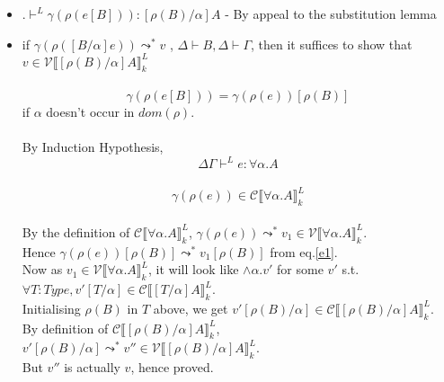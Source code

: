 \documentclass[12pt]{article}
\begin{document}
\begin{itemize} 
\item $. \vdash^L \gamma(\rho(e [B])) :  [\rho(B)/\alpha]A$
  - By appeal to the substitution lemma\\
\item if $ \gamma(\rho([B/\alpha]e)) \leadsto^{*} v$ ,
$\Delta \vdash B, \Delta \vdash \Gamma$, then it suffices to show that\\
$v \in \mathscr{V}\llbracket [\rho(B)/ \alpha] A
\rrbracket_k^L$\\
\\
\begin{equation} \label{e1}
\gamma(\rho(e [B])) = \gamma(\rho(e)) [\rho(B)]
\end{equation}
if $\alpha$ doesn't occur in $dom(\rho)$.\\
\\
By Induction Hypothesis,\\
$$
\Delta\Gamma \vdash^{L} e:\forall \alpha.A
$$\\
$$
\gamma(\rho(e)) \in
\mathscr{C}\llbracket\forall\alpha.A \rrbracket_k^L
$$\\
By the definition of $\mathscr{C}\llbracket\forall\alpha.A
\rrbracket_k^L$, $\gamma(\rho(e)) \leadsto^{*} v_1 \in \mathscr{V}\llbracket \forall\alpha.A
\rrbracket_k^L$.\\
Hence $\gamma(\rho(e)) [\rho(B)] \leadsto^{*} v_1 [\rho(B)]$ from eq.\ref{e1}.\\
Now as $v_1 \in \mathscr{V}\llbracket \forall\alpha.A \rrbracket_k^L$,
it will look like $\wedge\alpha.v'$ for some $v'$ s.t. $\forall
T:Type, v'[T/\alpha] \in \mathscr{C}\llbracket [T/\alpha]A
\rrbracket^L_k$.\\
Initialising $\rho(B)$ in $T$ above, we get $v'[\rho(B)/\alpha] \in \mathscr{C}\llbracket [\rho(B)/\alpha]A
\rrbracket^L_k$.\\
By definition of $\mathscr{C}\llbracket [\rho(B)/\alpha]A
\rrbracket^L_k$, $v'[\rho(B)/\alpha] \leadsto^{*} v'' \in \mathscr{V}\llbracket [\rho(B)/\alpha]A
\rrbracket^L_k$.\\
But $v''$ is actually $v$, hence proved.

\end{itemize}
\end{document}

